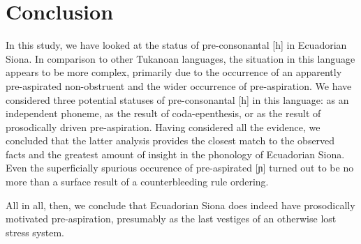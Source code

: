 \documentclass[output=paper]{langscibook}
\begin{document}
\section{Conclusion}\label{sec-conc}
In this study, we have looked at the status of pre-consonantal [h] in Ecuadorian Siona. In comparison to other Tukanoan languages, the situation in this language appears to be more complex, primarily due to the occurrence of an apparently pre-aspirated non-obstruent and the wider occurrence of pre-aspiration. We have considered three potential statuses of pre-consonantal [h] in this language: as an independent phoneme, as the result of coda-epenthesis, or as the result of prosodically driven pre-aspiration. Having considered all the evidence, we concluded that the latter analysis provides the closest match to the observed facts and the greatest amount of insight in the phonology of Ecuadorian Siona. Even the superficially spurious occurence of pre-aspirated [ɲ] turned out to be no more than a surface result of a counterbleeding rule ordering.

All in all, then, we conclude that Ecuadorian Siona does indeed have prosodically motivated pre-aspiration, presumably as the last vestiges of an otherwise lost stress system.


\end{document}
